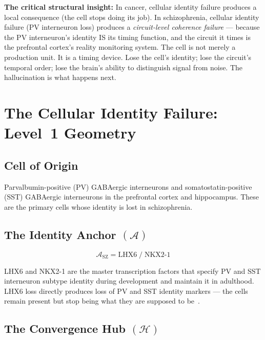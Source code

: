 \documentclass[12pt,a4paper]{article}
\newenvironment{warnenv}{%
  \begin{tcolorbox}[colback=red!5,colframe=warnbox,boxrule=1pt,
    arc=3pt,left=8pt,right=8pt,top=6pt,bottom=6pt,breakable]}{%
  \end{tcolorbox}}
\newcommand{\IA}{\mathcal{A}}
\newcommand{\Hub}{\mathcal{H}}
\begin{document}
\begin{warnenv}
\textbf{The critical structural insight:}
In cancer, cellular identity failure produces a local consequence
(the cell stops doing its job). In schizophrenia, cellular
identity failure (PV interneuron loss) produces a
\emph{circuit-level coherence failure} --- because the PV
interneuron's identity IS its timing function, and the circuit
it times is the prefrontal cortex's reality monitoring system.
The cell is not merely a production unit. It is a timing device.
Lose the cell's identity; lose the circuit's temporal order;
lose the brain's ability to distinguish signal from noise.
The hallucination is what happens next.
\end{warnenv}

\section{The Cellular Identity Failure: Level~1 Geometry}

\subsection{Cell of Origin}

Parvalbumin-positive (PV) GABAergic interneurons and
somatostatin-positive (SST) GABAergic interneurons in the
prefrontal cortex and hippocampus. These are the primary
cells whose identity is lost in schizophrenia.

\subsection{The Identity Anchor \texorpdfstring{$(\IA)$}{(A)}}

\begin{equation}
  \IA_{\mathrm{SZ}} = \text{LHX6} \;/\; \text{NKX2-1}
  \label{eq:anchor_sz}
\end{equation}

LHX6 and NKX2-1 are the master transcription factors that
specify PV and SST interneuron subtype identity during
development and maintain it in adulthood. LHX6 loss directly
produces loss of PV and SST identity markers --- the cells
remain present but stop being what they are supposed to
be~\cite{Liodakis2024,Maroof2013}.

\subsection{The Convergence Hub \texorpdfstring{$(\Hub)$}{(H)}}
\end{document}
